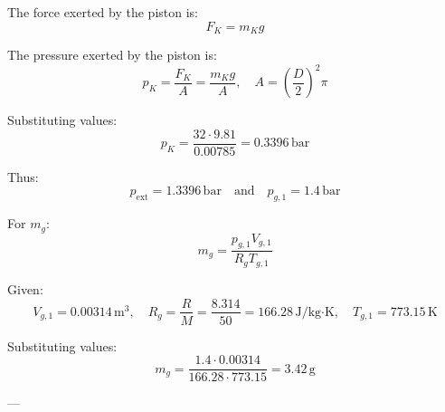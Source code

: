 The force exerted by the piston is:  
\[
F_K = m_K g
\]  

The pressure exerted by the piston is:  
\[
p_K = \frac{F_K}{A} = \frac{m_K g}{A}, \quad A = \left(\frac{D}{2}\right)^2 \pi
\]  

Substituting values:  
\[
p_K = \frac{32 \cdot 9.81}{0.00785} = 0.3396 \, \text{bar}
\]  

Thus:  
\[
p_{\text{ext}} = 1.3396 \, \text{bar} \quad \text{and} \quad p_{g,1} = 1.4 \, \text{bar}
\]  

For \( m_g \):  
\[
m_g = \frac{p_{g,1} V_{g,1}}{R_g T_{g,1}}
\]  

Given:  
\[
V_{g,1} = 0.00314 \, \text{m}^3, \quad R_g = \frac{R}{M} = \frac{8.314}{50} = 166.28 \, \text{J/kg·K}, \quad T_{g,1} = 773.15 \, \text{K}
\]  

Substituting values:  
\[
m_g = \frac{1.4 \cdot 0.00314}{166.28 \cdot 773.15} = 3.42 \, \text{g}
\]  

---